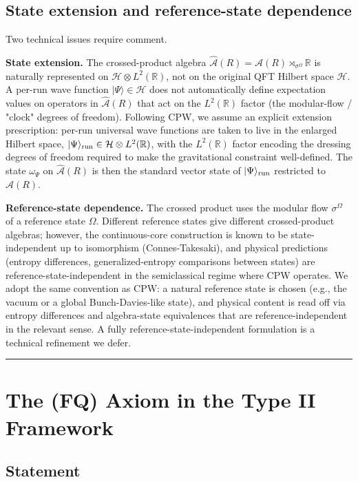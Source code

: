 \documentclass[11pt,a4paper]{article}
\begin{document}
\subsection{State extension and reference-state dependence}

Two technical issues require comment.

\textbf{State extension.} The crossed-product algebra $\hat{\mathcal{A}}(R) = \mathcal{A}(R) \rtimes_{\sigma^\Omega} \mathbb{R}$ is naturally represented on $\mathcal{H} \otimes L^2(\mathbb{R})$, not on the original QFT Hilbert space $\mathcal{H}$. A per-run wave function $|\Psi\rangle \in \mathcal{H}$ does not automatically define expectation values on operators in $\hat{\mathcal{A}}(R)$ that act on the $L^2(\mathbb{R})$ factor (the modular-flow / "clock" degrees of freedom). Following CPW, we assume an explicit extension prescription: per-run universal wave functions are taken to live in the enlarged Hilbert space, $|\Psi\rangle_{\rm run} \in \mathcal{H} \otimes L^2(\mathbb{R})$, with the $L^2(\mathbb{R})$ factor encoding the dressing degrees of freedom required to make the gravitational constraint well-defined. The state $\omega_\Psi$ on $\hat{\mathcal{A}}(R)$ is then the standard vector state of $|\Psi\rangle_{\rm run}$ restricted to $\hat{\mathcal{A}}(R)$.

\textbf{Reference-state dependence.} The crossed product uses the modular flow $\sigma^\Omega$ of a reference state $\Omega$. Different reference states give different crossed-product algebras; however, the continuous-core construction is known to be state-independent up to isomorphism (Connes-Takesaki), and physical predictions (entropy differences, generalized-entropy comparisons between states) are reference-state-independent in the semiclassical regime where CPW operates. We adopt the same convention as CPW: a natural reference state is chosen (e.g., the vacuum or a global Bunch-Davies-like state), and physical content is read off via entropy differences and algebra-state equivalences that are reference-independent in the relevant sense. A fully reference-state-independent formulation is a technical refinement we defer.

\medskip\hrule\medskip

\section{The (FQ) Axiom in the Type II Framework}

\subsection{Statement}
\end{document}
